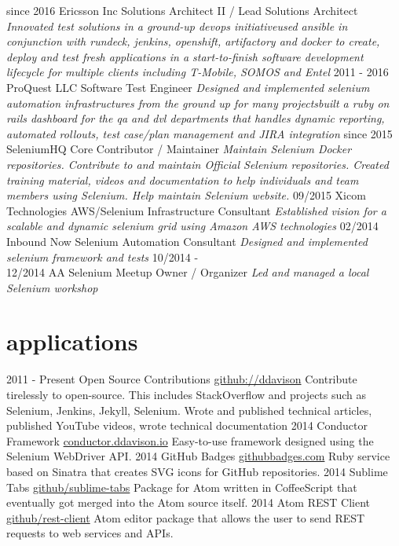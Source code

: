 \documentclass[]{ddavison-resume}
\begin{document}
\begin{entrylist}
  \entry
         {since 2016}
         {Ericsson Inc}
         {Solutions Architect II / Lead Solutions Architect}
         {\emph{Innovated test solutions in a ground-up devops initiative\bullet used ansible in conjunction with rundeck, jenkins, openshift, artifactory and docker to create, deploy and test fresh applications in a start-to-finish software development lifecycle for multiple clients including T-Mobile, SOMOS and Entel}}
  \entry
  	{2011 - 2016}
  	{ProQuest LLC}
  	{Software Test Engineer}
  	{\emph{Designed and implemented selenium automation infrastructures from the ground up for many projects\bullet built a ruby on rails dashboard for the qa and dvl departments that handles dynamic reporting, automated rollouts, test case/plan management and JIRA integration}} 
  \entry
  	{since 2015}
  	{SeleniumHQ}
  	{Core Contributor / Maintainer}
  	{\emph{Maintain Selenium Docker repositories.  Contribute to and maintain Official Selenium repositories. Created training material, videos and documentation to help individuals and team members using Selenium.  Help maintain Selenium website.}}
  \entry
  	{09/2015}
  	{Xicom Technologies}
  	{AWS/Selenium Infrastructure Consultant}
  	{\emph{Established vision for a scalable and dynamic selenium grid using Amazon AWS technologies}}
  \entry
  	{02/2014}
  	{Inbound Now}
  	{Selenium Automation Consultant}
  	{\emph{Designed and implemented selenium framework and tests}}
  \entry
  	{10/2014 - \\
  	12/2014}
  	{AA Selenium Meetup}
  	{Owner / Organizer}
  	{\emph{Led and managed a local Selenium workshop}}
\end{entrylist}

\section{applications}

\begin{entrylist}
  \entry
    {2011 - Present}
    {Open Source Contributions}
    {\href{https://github.com/ddavison}{github://ddavison}}
    {Contribute tirelessly to open-source.  This includes StackOverflow and projects such as Selenium, Jenkins, Jekyll, Selenium. Wrote and published technical articles, published YouTube videos, wrote technical documentation}
  \entry
    {2014}
    {Conductor Framework}
    {\href{https://conductor.ddavison.io}{conductor.ddavison.io}}
    {Easy-to-use framework designed using the Selenium WebDriver API.}
  \entry
    {2014}
    {GitHub Badges}
    {\href{https://github.com/ddavison/github-badges}{githubbadges.com}}
    {Ruby service based on Sinatra that creates SVG icons for GitHub repositories.}
  \entry
    {2014}
    {Sublime Tabs}
    {\href{https://github.com/ddavison/sublime-tabs}{github/sublime-tabs}}
    {Package for Atom written in CoffeeScript that eventually got merged into the Atom source itself.}
  \entry
  	{2014}
  	{Atom REST Client}
  	{\href{https://github.com/ddavison/rest-client}{github/rest-client}}
  	{Atom editor package that allows the user to send REST requests to web services and APIs.}
\end{entrylist}
\end{document}
